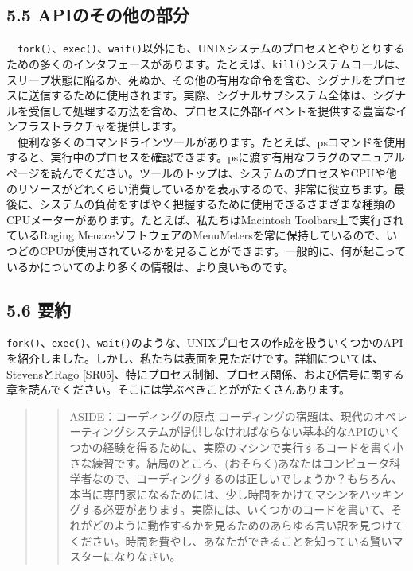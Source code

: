\hypertarget{apiux306eux305dux306eux4ed6ux306eux90e8ux5206}{%
\subsection*{5.5
APIのその他の部分}\label{apiux306eux305dux306eux4ed6ux306eux90e8ux5206}}

　\texttt{fork()}、\texttt{exec()}、\texttt{wait()}以外にも、UNIXシステムのプロセスとやりとりするための多くのインタフェースがあります。たとえば、\texttt{kill()}システムコールは、スリープ状態に陥るか、死ぬか、その他の有用な命令を含む、シグナルをプロセスに送信するために使用されます。実際、シグナルサブシステム全体は、シグナルを受信して処理する方法を含め、プロセスに外部イベントを提供する豊富なインフラストラクチャを提供します。\\
　便利な多くのコマンドラインツールがあります。たとえば、psコマンドを使用すると、実行中のプロセスを確認できます。psに渡す有用なフラグのマニュアルページを読んでください。ツールのトップは、システムのプロセスやCPUや他のリソースがどれくらい消費しているかを表示するので、非常に役立ちます。最後に、システムの負荷をすばやく把握するために使用できるさまざまな種類のCPUメーターがあります。たとえば、私たちはMacintosh
Toolbars上で実行されているRaging
MenaceソフトウェアのMenuMetersを常に保持しているので、いつどのCPUが使用されているかを見ることができます。一般的に、何が起こっているかについてのより多くの情報は、より良いものです。

\hypertarget{ux8981ux7d04}{%
\subsection*{5.6 要約}\label{ux8981ux7d04}}

\texttt{fork()}、\texttt{exec()}、\texttt{wait()}のような、UNIXプロセスの作成を扱ういくつかのAPIを紹介しました。しかし、私たちは表面を見ただけです。詳細については、StevensとRago
{[}SR05{]}、特にプロセス制御、プロセス関係、および信号に関する章を読んでください。そこには学ぶべきことががたくさんあります。

\begin{quote}
\begin{quote}
ASIDE：コーディングの原点
コーディングの宿題は、現代のオペレーティングシステムが提供しなければならない基本的なAPIのいくつかの経験を得るために、実際のマシンで実行するコードを書く小さな練習です。結局のところ、(おそらく)あなたはコンピュータ科学者なので、コーディングするのは正しいでしょうか？もちろん、本当に専門家になるためには、少し時間をかけてマシンをハッキングする必要があります。実際には、いくつかのコードを書いて、それがどのように動作するかを見るためのあらゆる言い訳を見つけてください。時間を費やし、あなたができることを知っている賢いマスターになりなさい。
\end{quote}
\end{quote}

